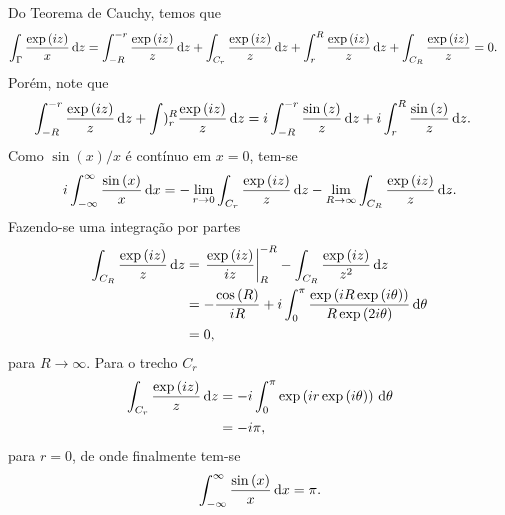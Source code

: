 \documentclass[a4paper,12pt, leqno, answers]{exam}
\begin{document}
\begin{questions}
\begin{solution}
    Do Teorema de Cauchy, temos que
    \begin{align*}
      \int_\Gamma \frac{\exp\left( i z \right)}{x} \, \mathrm{d}z &= \int_{-R}^{-r} \frac{\exp\left( i z \right)}{z} \, \mathrm{d}z + \int_{C_r} \frac{\exp\left( i z \right)}{z} \, \mathrm{d}z + \int_r^R \frac{\exp\left( i z \right)}{z} \, \mathrm{d}z + \int_{C_R} \frac{\exp\left( i z \right)}{z} = 0.
    \end{align*}
    Porém, note que
    \begin{align*}
      \int_{-R}^{-r} \frac{\exp\left( i z \right)}{z} \, \mathrm{d}z + \int)_r^R \frac{\exp\left( i z \right)}{z} \, \mathrm{d}z &= i \int_{-R}^{-r} \frac{\sin\left( z \right)}{z} \, \mathrm{d}z + i \int_r^R \frac{\sin\left( z \right)}{z} \, \mathrm{d}z.
    \end{align*}
    Como $\sin\left( x \right) / x$ é cont\'{i}nuo em $x = 0$, tem-se
    \begin{align*}
      i \int_{-\infty}^\infty \frac{\sin\left( x \right)}{x} \, \mathrm{d}x = - \lim_{r \to 0} \int_{C_r} \frac{\exp\left( i z \right)}{z} \, \mathrm{d}z - \lim_{R \to \infty} \int_{C_R} \frac{\exp\left( i z \right)}{z} \, \mathrm{d}z.
    \end{align*}
    Fazendo-se uma integração por partes
    \begin{align*}
      \int_{C_R} \frac{\exp\left( i z \right)}{z} \, \mathrm{d}z &= \left. \frac{\exp\left( i z \right)}{i z} \right|_R^{-R} - \int_{C_R} \frac{\exp\left( i z \right)}{z^2} \, \mathrm{d}z \\
      &= - \frac{\cos\left( R \right)}{i R} + i \int_0^\pi \frac{\exp\left( i R \exp\left( i \theta \right) \right)}{R \exp\left( 2 i \theta \right)} \, \mathrm{d}\theta \\
      &= 0,
    \end{align*}
    para $R \to \infty$. Para o trecho $C_r$
    \begin{align*}
      \int_{C_r} \frac{\exp\left( i z \right)}{z} \, \mathrm{d}z &= - i \int_0^\pi \exp\left( i r \exp\left( i \theta \right) \right) \, \mathrm{d}\theta \\
      &= - i \pi,
    \end{align*}
    para $r = 0$, de onde finalmente tem-se
    \begin{align*}
      \int_{-\infty}^\infty \frac{\sin\left( x \right)}{x} \, \mathrm{d}x = \pi.
    \end{align*}
  \end{solution}


\end{questions}
\end{document}
